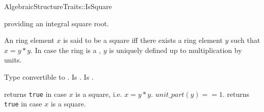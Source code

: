 

\begin{ccRefFunctionObjectConcept}{AlgebraicStructureTraits::IsSquare}

\ccDefinition

 providing an integral square root. 

An ring element $x$ is said to be a square iff there exists a ring element $y$ such
that $x= y*y$. In case the ring is a ,
$y$ is uniquely defined up to multiplication by units. \\


\ccRefines 


\ccTypes
{} 
        { Type convertible to .}
\ccGlue
{} 
        { Is .}
\ccGlue
{} 
        { Is .}

\ccOperations
{}

        { returns {\tt true} in case $x$ is a square, i.e. $x = y*y$.
          \ccPostcond $unit\_part(y) == 1$. 
        }
        { returns {\tt true} in case $x$ is a square.
        }


\ccSeeAlso


\end{ccRefFunctionObjectConcept} 